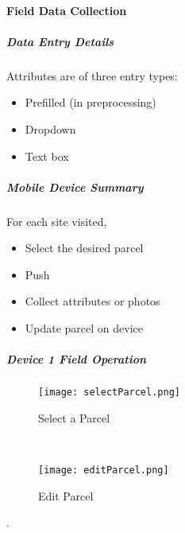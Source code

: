 

 \clearpage

 \paragraph{Field Data Collection}
 
 \subparagraph{Data Entry Details}

 Attributes are of three entry types:
 \begin{itemize}
 \item Prefilled {\scriptsize (in preprocessing)}
 \item Dropdown
 \item Text box
 \end{itemize}
 \vspace{1in}

 \subparagraph{Mobile Device Summary}

 For each site visited,

 \begin{itemize}
 \item Select the desired parcel
 \item Push 
 \item Collect attributes or photos
 \item Update parcel on device
 \end{itemize}

 \clearpage


 \subparagraph{Device 1 Field Operation}

 \begin{wrapfigure}{r}{0.5\textwidth}
 \centering
     \texttt{[image: selectParcel.png]}
 \vspace{-.1in}
 
 \caption {Select a Parcel}
 \vspace{.1in}

 \HRule \\[.4cm] %
 \vspace{.1in}

 \centering
     \texttt{[image: editParcel.png]}
     \vspace{-.1in}
     
 \caption{Edit Parcel}
 \end{wrapfigure}
 .
 \vspace{2in}

